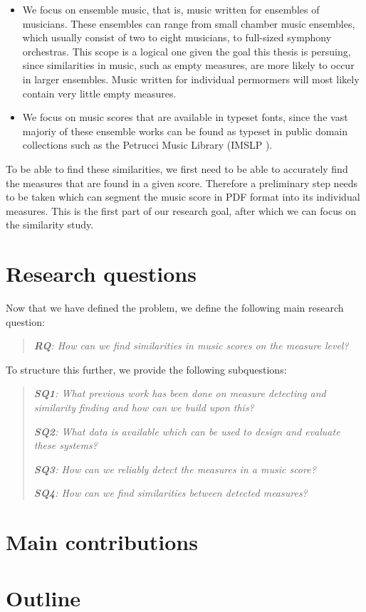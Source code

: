 \begin{itemize}
    \item We focus on ensemble music, that is, music written for ensembles of musicians. These ensembles can range from small chamber music ensembles, which usually consist of two to eight musicians, to full-sized symphony orchestras. This scope is a logical one given the goal this thesis is persuing, since similarities in music, such as empty measures, are more likely to occur in larger ensembles. Music written for individual permormers will most likely contain very little empty measures.
    \item We focus on music scores that are available in typeset fonts, since the vast majoriy of these ensemble works can be found as typeset in public domain collections such as the Petrucci Music Library (IMSLP \citep{IMSLP}).
\end{itemize}

To be able to find these similarities, we first need to be able to accurately find the measures that are found in a given score. Therefore a preliminary step needs to be taken which can segment the music score in PDF format into its individual measures. This is the first part of our research goal, after which we can focus on the similarity study.

\section{Research questions}\label{sec:introduction-research-questions}
Now that we have defined the problem, we define the following main research question:

\begin{quote}
    {\itshape \textbf{RQ}: How can we find similarities in music scores on the measure level?}
\end{quote}

\noindent To structure this further, we provide the following subquestions:

\begin{quote}
    {\itshape \textbf{SQ1}: What previous work has been done on measure detecting and similarity finding and how can we build upon this?}

    {\itshape \textbf{SQ2}: What data is available which can be used to design and evaluate these systems?}

    {\itshape \textbf{SQ3}: How can we reliably detect the measures in a music score?}

    {\itshape \textbf{SQ4}: How can we find similarities between detected measures?}
\end{quote}

\section{Main contributions}\label{sec:introduction-contributions}

\section{Outline}\label{sec:introduction-outline}
